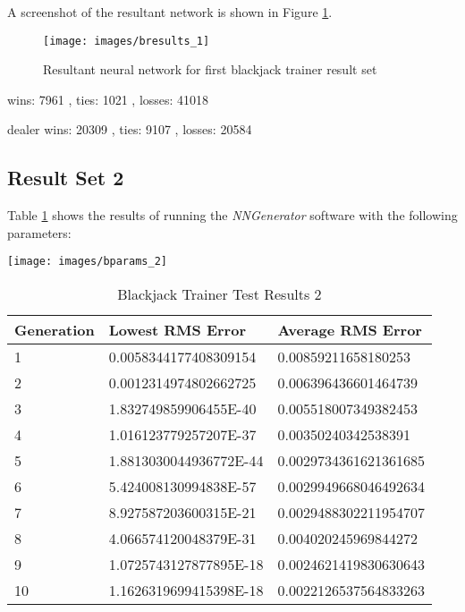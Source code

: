 A screenshot of the resultant network is shown in Figure \ref{bresults_1}.

\begin{figure}[h!]
  \centering
  \texttt{[image: images/bresults\_1]}
  \caption{Resultant neural network for first blackjack trainer result set}
  \label{bresults_1}
\end{figure}

wins:  7961 , ties:  1021 , losses:  41018

dealer wins:  20309 , ties:  9107 , losses:  20584


\subsection{Result Set 2}
Table \ref{btr2} shows the results of running the {\it NNGenerator} software with the following parameters:

\begin{center}
\texttt{[image: images/bparams\_2]}
\end{center}

\begin{center}
    \begin{longtable}{ | l | l | l |}
      \caption{Blackjack Trainer Test Results 2} \label{btr2} \\
   \hline
  Generation & Lowest RMS Error & Average RMS Error \\ \hline
1 &	0.0058344177408309154 &	0.00859211658180253 \\ \hline
2 &	0.0012314974802662725 &	0.006396436601464739 \\ \hline
3 &	1.832749859906455E-40 &	0.005518007349382453 \\ \hline
4 &	1.016123779257207E-37 &	0.00350240342538391 \\ \hline
5 &	1.8813030044936772E-44 &	0.0029734361621361685 \\ \hline
6 &	5.424008130994838E-57 &	0.0029949668046492634 \\ \hline
7 &	8.927587203600315E-21 &	0.0029488302211954707 \\ \hline
8 &	4.066574120048379E-31 &	0.004020245969844272 \\ \hline
9 &	1.0725743127877895E-18 &	0.0024621419830630643 \\ \hline
10 &	1.1626319699415398E-18 &	0.0022126537564833263 \\ \hline
\end{longtable}
\end{center}

